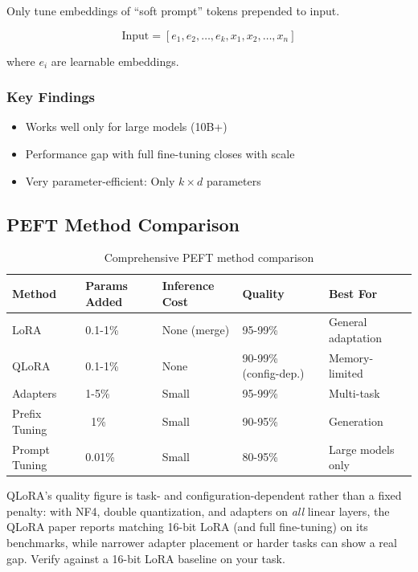 Only tune embeddings of ``soft prompt'' tokens prepended to input.

\begin{equation}
\text{Input} = [e_1, e_2, \ldots, e_k, x_1, x_2, \ldots, x_n]
\end{equation}

where $e_i$ are learnable embeddings.

\subsubsection{Key Findings}

\begin{itemize}
    \item Works well only for large models (10B+)
    \item Performance gap with full fine-tuning closes with scale
    \item Very parameter-efficient: Only $k \times d$ parameters
\end{itemize}

\subsection{PEFT Method Comparison}

\begin{table}[H]
\centering
\caption{Comprehensive PEFT method comparison}
\begin{tabularx}{\textwidth}{lXXXX}
\toprule
\textbf{Method} & \textbf{Params Added} & \textbf{Inference Cost} & \textbf{Quality} & \textbf{Best For} \\
\midrule
LoRA & 0.1-1\% & None (merge) & 95-99\% & General adaptation \\
QLoRA & 0.1-1\% & None & 90-99\% (config-dep.) & Memory-limited \\
Adapters & 1-5\% & Small & 95-99\% & Multi-task \\
Prefix Tuning & ~1\% & Small & 90-95\% & Generation \\
Prompt Tuning & 0.01\% & Small & 80-95\% & Large models only \\
\bottomrule
\end{tabularx}
\end{table}

QLoRA's quality figure is task- and configuration-dependent rather than a fixed penalty: with NF4, double quantization, and adapters on \textit{all} linear layers, the QLoRA paper reports matching 16-bit LoRA (and full fine-tuning) on its benchmarks, while narrower adapter placement or harder tasks can show a real gap. Verify against a 16-bit LoRA baseline on your task.

